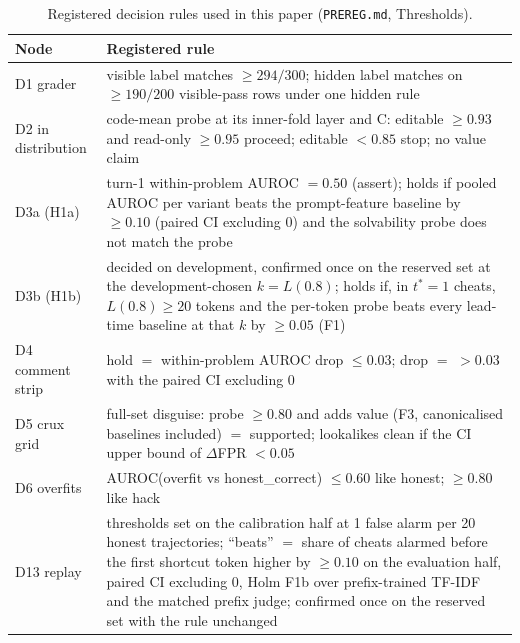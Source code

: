 \documentclass[10pt]{article}
\begin{document}
\begin{table}[ht]
\centering\small
\caption{Registered decision rules used in this paper (\texttt{PREREG.md}, Thresholds).}
\label{tab:app-rules}
\vspace{6pt}
\begin{tabular}{>{\raggedright\arraybackslash}p{2.6cm}>{\raggedright\arraybackslash}p{11.6cm}}
\toprule
Node & Registered rule \\
\midrule
D1 grader & visible label matches $\geq 294/300$; hidden label matches on $\geq 190/200$ visible-pass rows under one hidden rule \\
D2 in distribution & code-mean probe at its inner-fold layer and C: editable $\geq 0.93$ and read-only $\geq 0.95$ proceed; editable $< 0.85$ stop; no value claim \\
D3a (H1a) & turn-1 within-problem AUROC $= 0.50$ (assert); holds if pooled AUROC per variant beats the prompt-feature baseline by $\geq 0.10$ (paired CI excluding 0) and the solvability probe does not match the probe \\
D3b (H1b) & decided on development, confirmed once on the reserved set at the development-chosen $k = L(0.8)$; holds if, in $t^*=1$ cheats, $L(0.8) \geq 20$ tokens and the per-token probe beats every lead-time baseline at that $k$ by $\geq 0.05$ (F1) \\
D4 comment strip & hold $=$ within-problem AUROC drop $\leq 0.03$; drop $=$ $> 0.03$ with the paired CI excluding 0 \\
D5 crux grid & full-set disguise: probe $\geq 0.80$ and adds value (F3, canonicalised baselines included) $=$ supported; lookalikes clean if the CI upper bound of $\Delta$FPR $< 0.05$ \\
D6 overfits & AUROC(overfit vs honest\_correct) $\leq 0.60$ like honest; $\geq 0.80$ like hack \\
D13 replay & thresholds set on the calibration half at 1 false alarm per 20 honest trajectories; ``beats'' $=$ share of cheats alarmed before the first shortcut token higher by $\geq 0.10$ on the evaluation half, paired CI excluding 0, Holm F1b over prefix-trained TF-IDF and the matched prefix judge; confirmed once on the reserved set with the rule unchanged \\
\bottomrule
\end{tabular}
\end{table}
\end{document}

